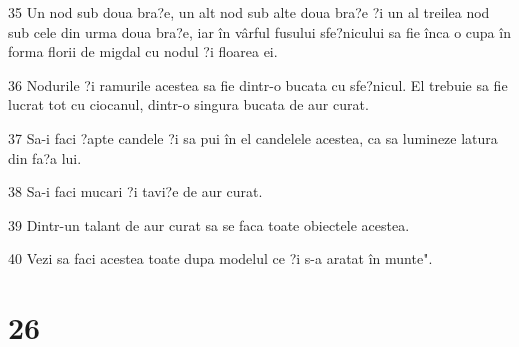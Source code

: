 \par 35 Un nod sub doua bra?e, un alt nod sub alte doua bra?e ?i un al treilea nod sub cele din urma doua bra?e, iar în vârful fusului sfe?nicului sa fie înca o cupa în forma florii de migdal cu nodul ?i floarea ei.
\par 36 Nodurile ?i ramurile acestea sa fie dintr-o bucata cu sfe?nicul. El trebuie sa fie lucrat tot cu ciocanul, dintr-o singura bucata de aur curat.
\par 37 Sa-i faci ?apte candele ?i sa pui în el candelele acestea, ca sa lumineze latura din fa?a lui.
\par 38 Sa-i faci mucari ?i tavi?e de aur curat.
\par 39 Dintr-un talant de aur curat sa se faca toate obiectele acestea.
\par 40 Vezi sa faci acestea toate dupa modelul ce ?i s-a aratat în munte".

\chapter{26}

